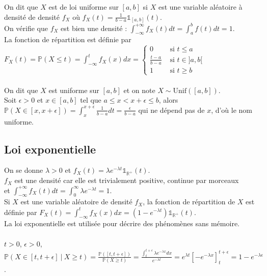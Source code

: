 \documentclass[a4paper,10pt]{book} %
\newcommand{\R}{\mathbb{R}}
\renewcommand{\P}{\mathbb{P}} %
\newcommand{\tq}{~|~}
\newcommand{\Uni}{\mathrm{Unif}} %
\newcommand{\indi}{\mathds{1}} %
\begin{document}
On dit que $X$ est de loi uniforme sur $[a,b]$ si $X$ est une variable aléatoire à densité de densité $f_X$ où $\displaystyle f_X(t)=\frac{1}{b-a}\indi_{[a,b]}(t)$.\\

On vérifie que $f_X$ est bien une densité : $\displaystyle \int_{-\infty}^{+\infty}f_X(t)dt=\int_a^bf(t)dt=1$.\\

La fonction de répartition est définie par $\displaystyle F_X(t)=\P(X\leq t)=\int_{-\infty}^tf_X(x)dx=\left\{\begin{array}{rl}
0&\text{ si }t\leq a \\
\frac{t-a}{b-a} &\text{ si } t\in ]a,b[\\
1&\text{ si }t\geq b
\end{array}\right.$\\\\

On dit que $X$ est uniforme sur $[a,b]$ et on note $X\sim\Uni([a,b])$.\\

Soit $\epsilon>0$ et $x\in [a,b]$ tel que $\displaystyle a\leq x<x+\epsilon\leq b$, alors $\displaystyle \P(X\in [x,x+\epsilon]) = \int_x^{x+\epsilon}\frac{1}{b-a}dt = \frac{\epsilon}{b-a}$ qui ne dépend pas de $x$, d'où le nom uniforme.

\subsection{Loi exponentielle}
On se donne $\lambda>0$ et $\displaystyle f_X(t)=\lambda e^{-\lambda t}\indi_{\R^+}(t)$.\\
$f_X$ est une densité car elle est trivialement positive, continue par morceaux\\
et $\displaystyle \int_{-\infty}^{+\infty}f_X(t)dt=\int_0^\infty\lambda e^{-\lambda t}=1$.\\

Si $X$ est une variable aléatoire de densité $f_X$, la fonction de répartition de $X$ est définie par $\displaystyle F_X(t)=\int_{-\infty}^tf_X(x)dx=(1-e^{-\lambda t})\indi_{\R^+}(t)$.\\

La loi exponentielle est utilisée pour décrire des phénomènes sans mémoire.\\\\
$t>0$, $\epsilon>0$, $\displaystyle \P(X\in [t, t+\epsilon]\tq X\geq t)=\frac{\P([t,t+\epsilon])}{\P(X\geq t)}=\frac{\int_t^{t+\epsilon}\lambda e^{-\lambda x}dx}{e^{-\lambda t}}=e^{\lambda t}\left[-e^{-\lambda x}\right]_t^{t+\epsilon}=1-e^{-\lambda \epsilon}$.\\
\end{document}
